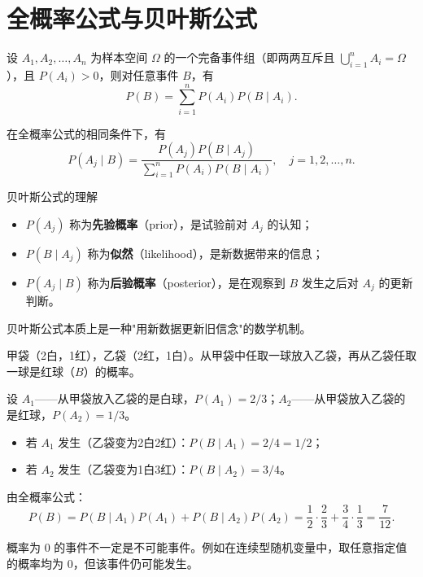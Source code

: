 \section{全概率公式与贝叶斯公式}

\begin{theorem}[全概率公式]
设 $A_1, A_2, \ldots, A_n$ 为样本空间 $\Omega$ 的一个完备事件组（即两两互斥且 $\bigcup_{i=1}^{n} A_i = \Omega$），且 $P(A_i) > 0$，则对任意事件 $B$，有
\[P(B) = \sum_{i=1}^{n} P(A_i) P(B \mid A_i).\]
\end{theorem}

\begin{theorem}[贝叶斯公式]
在全概率公式的相同条件下，有
\[P(A_j \mid B) = \frac{P(A_j) P(B \mid A_j)}{\displaystyle\sum_{i=1}^{n} P(A_i) P(B \mid A_i)},\quad j = 1, 2, \ldots, n.\]
\end{theorem}

\begin{myTheorem}{贝叶斯公式的理解}
\begin{itemize}
	\item $P(A_j)$ 称为\textbf{先验概率}（prior），是试验前对 $A_j$ 的认知；
	\item $P(B \mid A_j)$ 称为\textbf{似然}（likelihood），是新数据带来的信息；
	\item $P(A_j \mid B)$ 称为\textbf{后验概率}（posterior），是在观察到 $B$ 发生之后对 $A_j$ 的更新判断。
\end{itemize}
贝叶斯公式本质上是一种"用新数据更新旧信念"的数学机制。
\end{myTheorem}

\begin{example}
甲袋（2白，1红），乙袋（2红，1白）。从甲袋中任取一球放入乙袋，再从乙袋任取一球是红球（$B$）的概率。

设 $A_1$——从甲袋放入乙袋的是白球，$P(A_1) = 2/3$；$A_2$——从甲袋放入乙袋的是红球，$P(A_2) = 1/3$。

\begin{itemize}
	\item 若 $A_1$ 发生（乙袋变为2白2红）：$P(B \mid A_1) = 2/4 = 1/2$；
	\item 若 $A_2$ 发生（乙袋变为1白3红）：$P(B \mid A_2) = 3/4$。
\end{itemize}

由全概率公式：
\[P(B) = P(B \mid A_1)P(A_1) + P(B \mid A_2)P(A_2) = \frac{1}{2} \cdot \frac{2}{3} + \frac{3}{4} \cdot \frac{1}{3} = \frac{7}{12}.\]
\end{example}

\begin{remark}
概率为 $0$ 的事件不一定是不可能事件。例如在连续型随机变量中，取任意指定值的概率均为 $0$，但该事件仍可能发生。
\end{remark}
